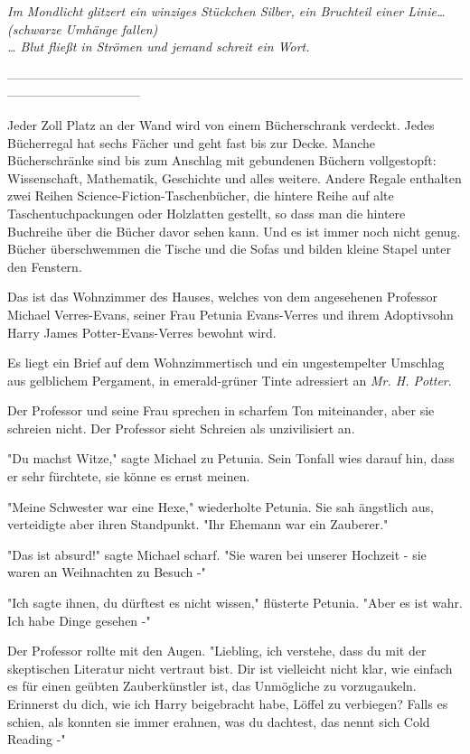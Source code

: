 {\emph{Im Mondlicht glitzert ein winziges Stückchen Silber, ein Bruchteil einer Linie…}\\ \emph{(schwarze Umhänge fallen)}\\ \emph{… Blut fließt in Strömen und jemand schreit ein Wort.}

--------------------------------------------------------------------------------------------------------------------------------------------

Jeder Zoll Platz an der Wand wird von einem Bücherschrank verdeckt. Jedes Bücherregal hat sechs Fächer und geht fast bis zur Decke. Manche Bücherschränke sind bis zum Anschlag mit gebundenen Büchern vollgestopft: Wissenschaft, Mathematik, Geschichte und alles weitere. Andere Regale enthalten zwei Reihen Science-Fiction-Taschenbücher, die hintere Reihe auf alte Taschentuchpackungen oder Holzlatten gestellt, so dass man die hintere Buchreihe über die Bücher davor sehen kann. Und es ist immer noch nicht genug. Bücher überschwemmen die Tische und die Sofas und bilden kleine Stapel unter den Fenstern.

Das ist das Wohnzimmer des Hauses, welches von dem angesehenen Professor Michael Verres-Evans, seiner Frau Petunia Evans-Verres und ihrem Adoptivsohn Harry James Potter-Evans-Verres bewohnt wird.

Es liegt ein Brief auf dem Wohnzimmertisch und ein ungestempelter Umschlag aus gelblichem Pergament, in emerald-grüner Tinte adressiert an \emph{Mr. H. Potter}.

Der Professor und seine Frau sprechen in scharfem Ton miteinander, aber sie schreien nicht. Der Professor sieht Schreien als unzivilisiert an.

"Du machst Witze," sagte Michael zu Petunia. Sein Tonfall wies darauf hin, dass er sehr fürchtete, sie könne es ernst meinen.

"Meine Schwester war eine Hexe," wiederholte Petunia. Sie sah ängstlich aus, verteidigte aber ihren Standpunkt. "Ihr Ehemann war ein Zauberer."

"Das ist absurd!" sagte Michael scharf. "Sie waren bei unserer Hochzeit - sie waren an Weihnachten zu Besuch -"

"Ich sagte ihnen, du dürftest es nicht wissen," flüsterte Petunia. "Aber es ist wahr. Ich habe Dinge gesehen -"

Der Professor rollte mit den Augen. "Liebling, ich verstehe, dass du mit der skeptischen Literatur nicht vertraut bist. Dir ist vielleicht nicht klar, wie einfach es für einen geübten Zauberkünstler ist, das Unmögliche zu vorzugaukeln. Erinnerst du dich, wie ich Harry beigebracht habe, Löffel zu verbiegen? Falls es schien, als konnten sie immer erahnen, was du dachtest, das nennt sich Cold Reading -"

}

